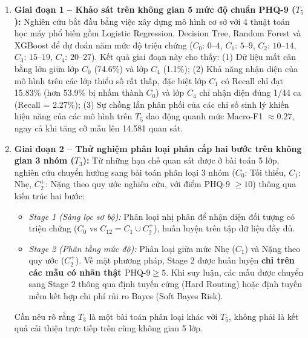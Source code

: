 \begin{enumerate}
    \item \textbf{Giai đoạn 1 -- Khảo sát trên không gian 5 mức độ chuẩn PHQ-9 ($T_5$):} 
    Nghiên cứu bắt đầu bằng việc xây dựng mô hình cơ sở với 4 thuật toán học máy phổ biến gồm Logistic Regression, Decision Tree, Random Forest và XGBoost để dự đoán năm mức độ triệu chứng ($C_0$: $0$--$4$, $C_1$: $5$--$9$, $C_2$: $10$--$14$, $C_3$: $15$--$19$, $C_4$: $20$--$27$). Kết quả giai đoạn này cho thấy: (1) Dữ liệu mất cân bằng lớn giữa lớp $C_0$ (74.6\%) và lớp $C_4$ (1.1\%); (2) Khả năng nhận diện của mô hình trên các lớp thiểu số rất thấp, đặc biệt lớp $C_1$ có Recall chỉ đạt 15.83\% (hơn 53.9\% bị nhầm thành $C_0$) và lớp $C_4$ chỉ nhận diện đúng 1/44 ca (Recall = 2.27\%); (3) Sự chồng lấn phân phối của các chỉ số sinh lý khiến hiệu năng của các mô hình trên $T_5$ dao động quanh mức Macro-F1 $\approx 0.27$, ngay cả khi tăng cỡ mẫu lên 14.581 quan sát.
    \item \textbf{Giai đoạn 2 -- Thử nghiệm phân loại phân cấp hai bước trên không gian 3 nhóm ($T_3$):} 
    Từ những hạn chế quan sát được ở bài toán 5 lớp, nghiên cứu chuyển hướng sang bài toán phân loại 3 nhóm ($C_0$: Tối thiểu, $C_1$: Nhẹ, $C_2^+$: Nặng theo quy ước nghiên cứu, với điểm PHQ-9 $\ge 10$) thông qua kiến trúc hai bước:
    \begin{itemize}
        \item \textit{Stage 1 (Sàng lọc sơ bộ):} Phân loại nhị phân để nhận diện đối tượng có triệu chứng ($C_0$ vs $C_{12} = C_1 \cup C_2^+$), huấn luyện trên tập dữ liệu đầy đủ.
        \item \textit{Stage 2 (Phân tầng mức độ):} Phân loại giữa mức Nhẹ ($C_1$) và Nặng theo quy ước ($C_2^+$). Về mặt phương pháp, Stage 2 được huấn luyện \textbf{chỉ trên các mẫu có nhãn thật $\text{PHQ-9} \ge 5$}. Khi suy luận, các mẫu được chuyển sang Stage 2 thông qua định tuyến cứng (Hard Routing) hoặc định tuyến mềm kết hợp chi phí rủi ro Bayes (Soft Bayes Risk).
    \end{itemize}
    Cần nêu rõ rằng $T_3$ là một bài toán phân loại khác với $T_5$, không phải là kết quả cải thiện trực tiếp trên cùng không gian 5 lớp.
\end{enumerate}

